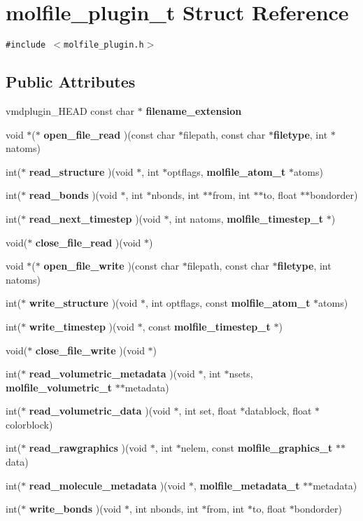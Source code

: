 \section{molfile\_\-plugin\_\-t  Struct Reference}
\label{structmolfile__plugin__t}
{\tt \#include $<$molfile\_\-plugin.h$>$}

\subsection*{Public Attributes}
\begin{CompactItemize}
\item 
vmdplugin\_\-HEAD const char $\ast$ {\bf filename\_\-extension}
\item 
void $\ast$($\ast$ {\bf open\_\-file\_\-read} )(const char $\ast$filepath, const char $\ast${\bf filetype}, int $\ast$natoms)
\item 
int($\ast$ {\bf read\_\-structure} )(void $\ast$, int $\ast$optflags, {\bf molfile\_\-atom\_\-t} $\ast$atoms)
\item 
int($\ast$ {\bf read\_\-bonds} )(void $\ast$, int $\ast$nbonds, int $\ast$$\ast$from, int $\ast$$\ast$to, float $\ast$$\ast$bondorder)
\item 
int($\ast$ {\bf read\_\-next\_\-timestep} )(void $\ast$, int natoms, {\bf molfile\_\-timestep\_\-t} $\ast$)
\item 
void($\ast$ {\bf close\_\-file\_\-read} )(void $\ast$)
\item 
void $\ast$($\ast$ {\bf open\_\-file\_\-write} )(const char $\ast$filepath, const char $\ast${\bf filetype}, int natoms)
\item 
int($\ast$ {\bf write\_\-structure} )(void $\ast$, int optflags, const {\bf molfile\_\-atom\_\-t} $\ast$atoms)
\item 
int($\ast$ {\bf write\_\-timestep} )(void $\ast$, const {\bf molfile\_\-timestep\_\-t} $\ast$)
\item 
void($\ast$ {\bf close\_\-file\_\-write} )(void $\ast$)
\item 
int($\ast$ {\bf read\_\-volumetric\_\-metadata} )(void $\ast$, int $\ast$nsets, {\bf molfile\_\-volumetric\_\-t} $\ast$$\ast$metadata)
\item 
int($\ast$ {\bf read\_\-volumetric\_\-data} )(void $\ast$, int set, float $\ast$datablock, float $\ast$colorblock)
\item 
int($\ast$ {\bf read\_\-rawgraphics} )(void $\ast$, int $\ast$nelem, const {\bf molfile\_\-graphics\_\-t} $\ast$$\ast$data)
\item 
int($\ast$ {\bf read\_\-molecule\_\-metadata} )(void $\ast$, {\bf molfile\_\-metadata\_\-t} $\ast$$\ast$metadata)
\item 
int($\ast$ {\bf write\_\-bonds} )(void $\ast$, int nbonds, int $\ast$from, int $\ast$to, float $\ast$bondorder)
\end{CompactItemize}


